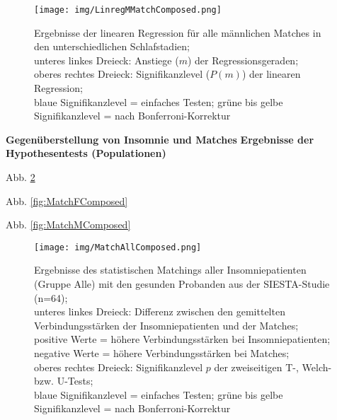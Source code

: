 \begin{figure}[H]
	\centering
	\texttt{[image: img/LinregMMatchComposed.png]}
	\caption[Ergebnisse der linearen Regression für alle männlichen Matches]{Ergebnisse der linearen Regression für alle männlichen Matches in den unterschiedlichen Schlafstadien;\\unteres linkes Dreieck: Anstiege ($m$) der Regressionsgeraden;\\oberes rechtes Dreieck: Signifikanzlevel ($P(m)$) der linearen Regression;\\blaue Signifikanzlevel = einfaches Testen; grüne bis gelbe Signifikanzlevel = nach Bonferroni-Korrektur}
	\label{fig:LinregMMatchComposed}
\end{figure}

\textbf{Gegenüberstellung von Insomnie und Matches}
\textbf{Ergebnisse der Hypothesentests (Populationen)}

Abb. \ref{fig:MatchAllComposed}

Abb. \ref{fig:MatchFComposed}

Abb. \ref{fig:MatchMComposed}




\begin{figure}[H]
	\centering
	\texttt{[image: img/MatchAllComposed.png]}
	\caption[Ergebnisse des statistischen Matchings der Insomniepatienten mit den gesunden Probanden]{Ergebnisse des statistischen Matchings aller Insomniepatienten (Gruppe Alle) mit den gesunden Probanden aus der SIESTA-Studie (n=64);\\unteres linkes Dreieck: Differenz zwischen den gemittelten Verbindungsstärken der Insomniepatienten und der Matches; positive Werte = höhere Verbindungsstärken bei Insomniepatienten; negative Werte = höhere Verbindungsstärken bei Matches;\\oberes rechtes Dreieck: Signifikanzlevel $p$ der zweiseitigen T-, Welch- bzw. U-Tests;\\blaue Signifikanzlevel = einfaches Testen; grüne bis gelbe Signifikanzlevel = nach Bonferroni-Korrektur}
	\label{fig:MatchAllComposed}
\end{figure}




